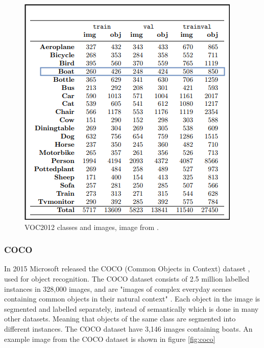 \begin{figure}[h!]
    \centering
    \includegraphics[scale=0.4]{fig/VOC2012.png}
    \caption{VOC2012 classes and images, image from \citep{Everingham2012}.}
    \label{fig:VOC2012}
\end{figure}

\clearpage

\subsubsection{COCO}
In 2015 Microsoft released the COCO (Common Objects in Context) dataset \citep{Lin2014}, used for object recognition. The COCO dataset consists of 2.5 million labelled instances in 328,000 images, and are "images of complex everyday scenes containing common objects in their natural context" \citep{Lin2014}. Each object in the image is segmented and labelled separately, instead of semantically which is done in many other datasets. Meaning that objects of the same class are segmented into different instances. The COCO dataset have 3,146 images containing boats. An example image from the COCO dataset is shown in figure \ref{fig:coco}

